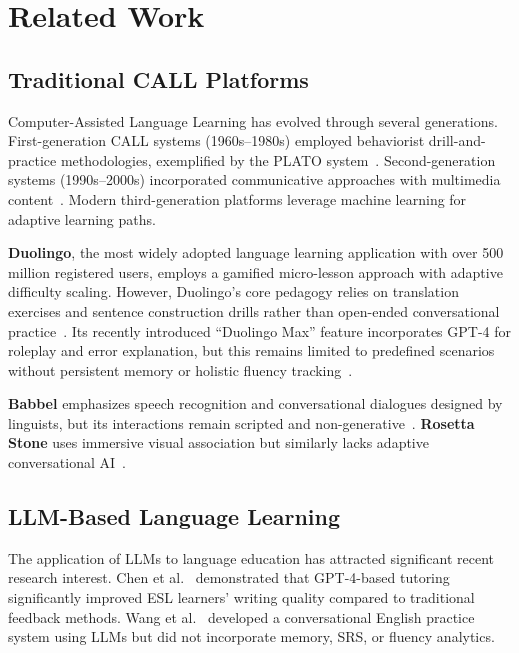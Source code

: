 \documentclass[conference]{IEEEtran}
\begin{document}
\section{Related Work}

\subsection{Traditional CALL Platforms}

Computer-Assisted Language Learning has evolved through several generations. First-generation CALL systems (1960s--1980s) employed behaviorist drill-and-practice methodologies, exemplified by the PLATO system~\cite{hart1981}. Second-generation systems (1990s--2000s) incorporated communicative approaches with multimedia content~\cite{levy1997}. Modern third-generation platforms leverage machine learning for adaptive learning paths.

\textbf{Duolingo}, the most widely adopted language learning application with over 500 million registered users, employs a gamified micro-lesson approach with adaptive difficulty scaling. However, Duolingo's core pedagogy relies on translation exercises and sentence construction drills rather than open-ended conversational practice~\cite{settles2016}. Its recently introduced ``Duolingo Max'' feature incorporates GPT-4 for roleplay and error explanation, but this remains limited to predefined scenarios without persistent memory or holistic fluency tracking~\cite{duolingomax2023}.

\textbf{Babbel} emphasizes speech recognition and conversational dialogues designed by linguists, but its interactions remain scripted and non-generative~\cite{vesselinov2016}. \textbf{Rosetta Stone} uses immersive visual association but similarly lacks adaptive conversational AI~\cite{rosettastone2020}.

\subsection{LLM-Based Language Learning}

The application of LLMs to language education has attracted significant recent research interest. Chen et al.~\cite{chen2020} demonstrated that GPT-4-based tutoring significantly improved ESL learners' writing quality compared to traditional feedback methods. Wang et al.~\cite{wang2023} developed a conversational English practice system using LLMs but did not incorporate memory, SRS, or fluency analytics.
\end{document}
